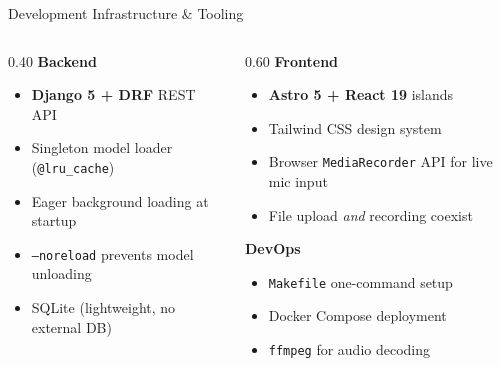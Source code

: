 \documentclass{beamer}
\begin{document}
\begin{frame}{Development Infrastructure \& Tooling}
    \begin{columns}[t]
        \begin{column}{0.40\textwidth}
            \textbf{Backend}
            \begin{itemize}
                \item \textbf{Django 5 + DRF} REST API
                \item Singleton model loader (\texttt{@lru\_cache})
                \item Eager background loading at startup
                \item \texttt{--noreload} prevents model unloading
                \item SQLite (lightweight, no external DB)
            \end{itemize}
        \end{column}

        \pause

        \begin{column}{0.60\textwidth}
            \textbf{Frontend}
            \begin{itemize}
                \item \textbf{Astro 5 + React 19} islands
                \item Tailwind CSS design system
                \item Browser \texttt{MediaRecorder} API for live mic input
                \item File upload \emph{and} recording coexist
            \end{itemize}

            \vspace{6pt}
            \textbf{DevOps}
            \begin{itemize}
                \item \texttt{Makefile} one-command setup
                \item Docker Compose deployment
                \item \texttt{ffmpeg} for audio decoding
            \end{itemize}
        \end{column}
    \end{columns}
\end{frame}
\end{document}
